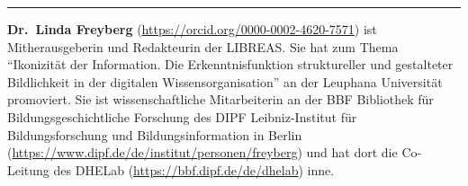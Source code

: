 \begin{center}\rule{0.5\linewidth}{0.5pt}\end{center}

\textbf{Dr.~Linda Freyberg}
(\url{https://orcid.org/0000-0002-4620-7571}) ist Mitherausgeberin und
Redakteurin der LIBREAS. Sie hat zum Thema \enquote{Ikonizität der Information.
Die Erkenntnisfunktion struktureller und gestalteter Bildlichkeit in der
digitalen Wissensorganisation} an der Leuphana Universität promoviert.
Sie ist wissenschaftliche Mitarbeiterin an der BBF \textbar{} Bibliothek
für Bildungsgeschichtliche Forschung des DIPF \textbar{}
Leibniz-Institut für Bildungsforschung und Bildungsinformation in Berlin
(\url{https://www.dipf.de/de/institut/personen/freyberg}) und hat dort
die Co-Leitung des DHELab (\url{https://bbf.dipf.de/de/dhelab}) inne.
